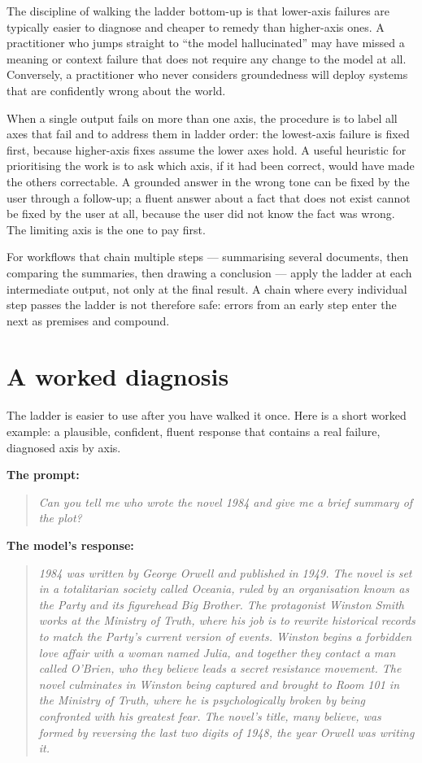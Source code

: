 The discipline of walking the ladder bottom-up is that
lower-axis failures are typically easier to diagnose and
cheaper to remedy than higher-axis ones. A practitioner who
jumps straight to ``the model hallucinated'' may have missed
a meaning or context failure that does not require any change
to the model at all. Conversely, a practitioner who never
considers groundedness will deploy systems that are confidently
wrong about the world.

When a single output fails on more than one axis, the
procedure is to label all axes that fail and to address them
in ladder order: the lowest-axis failure is fixed first,
because higher-axis fixes assume the lower axes hold. A useful
heuristic for prioritising the work is to ask which axis, if
it had been correct, would have made the others correctable.
A grounded answer in the wrong tone can be fixed by the user
through a follow-up; a fluent answer about a fact that does
not exist cannot be fixed by the user at all, because the
user did not know the fact was wrong. The limiting axis is
the one to pay first.

For workflows that chain multiple steps --- summarising
several documents, then comparing the summaries, then drawing
a conclusion --- apply the ladder at each intermediate output,
not only at the final result. A chain where every individual
step passes the ladder is not therefore safe: errors from an
early step enter the next as premises and compound.

\section{A worked diagnosis}

The ladder is easier to use after you have walked it once.
Here is a short worked example: a plausible, confident, fluent
response that contains a real failure, diagnosed axis by axis.

\medskip
\noindent\textbf{The prompt:}
\begin{quote}
\emph{Can you tell me who wrote the novel \textit{1984} and give
me a brief summary of the plot?}
\end{quote}

\noindent\textbf{The model's response:}
\begin{quote}
\emph{1984 was written by George Orwell and published in 1949.
The novel is set in a totalitarian society called Oceania,
ruled by an organisation known as the Party and its figurehead
Big Brother. The protagonist Winston Smith works at the Ministry
of Truth, where his job is to rewrite historical records to
match the Party's current version of events. Winston begins a
forbidden love affair with a woman named Julia, and together
they contact a man called O'Brien, who they believe leads a
secret resistance movement. The novel culminates in Winston
being captured and brought to Room 101 in the Ministry of
Truth, where he is psychologically broken by being confronted
with his greatest fear. The novel's title, many believe, was
formed by reversing the last two digits of 1948, the year
Orwell was writing it.}
\end{quote}

